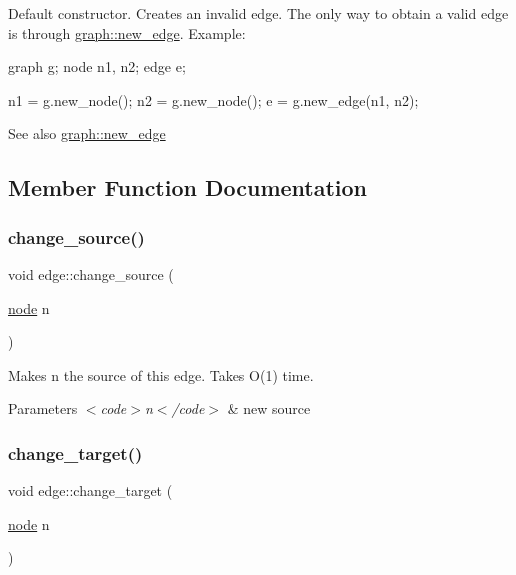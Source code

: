 Default constructor. Creates an invalid edge. The only way to obtain a valid edge is through \mbox{\hyperlink{classgraph_a02a0c3a219f75d68caa408ef339d4a1c}{graph\+::new\+\_\+edge}}. Example\+: 
\begin{DoxyPre}
  graph g;
  node n1, n2;
  edge e;\end{DoxyPre}



\begin{DoxyPre}  n1 = g.new\_node();
  n2 = g.new\_node();
  e = g.new\_edge(n1, n2);
\end{DoxyPre}


\begin{DoxySeeAlso}{See also}
\mbox{\hyperlink{classgraph_a02a0c3a219f75d68caa408ef339d4a1c}{graph\+::new\+\_\+edge}} 
\end{DoxySeeAlso}


\subsection{Member Function Documentation}
\mbox{\label{classedge_ad9e615b1a11bbc88aae2b166d377f354}} 
\subsubsection{\texorpdfstring{change\+\_\+source()}{change\_source()}}
{\footnotesize\ttfamily void edge\+::change\+\_\+source (\begin{DoxyParamCaption}\item[{\mbox{\hyperlink{classnode}{node}}}]{n }\end{DoxyParamCaption})}

Makes {\ttfamily n} the source of this edge. Takes O(1) time.


\begin{DoxyParams}{Parameters}
{\em $<$code$>$n$<$/code$>$} & new source \\
\hline
\end{DoxyParams}
\mbox{\label{classedge_a2f797fda0f41412265d793982f2cf953}} 
\subsubsection{\texorpdfstring{change\+\_\+target()}{change\_target()}}
{\footnotesize\ttfamily void edge\+::change\+\_\+target (\begin{DoxyParamCaption}\item[{\mbox{\hyperlink{classnode}{node}}}]{n }\end{DoxyParamCaption})}

